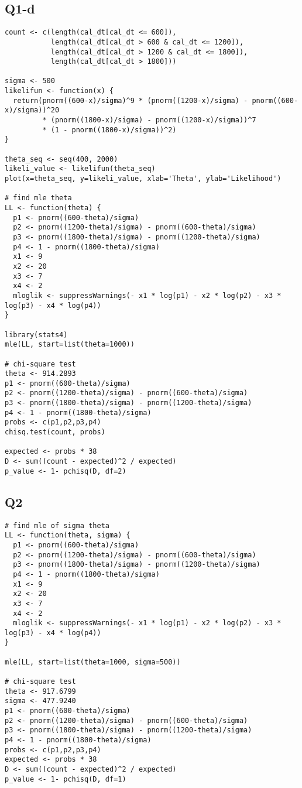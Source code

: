 \documentclass[11pt,letterpaper]{article}
\begin{document}
\subsection*{Q1-d}
\begin{verbatim}
count <- c(length(cal_dt[cal_dt <= 600]), 
           length(cal_dt[cal_dt > 600 & cal_dt <= 1200]), 
           length(cal_dt[cal_dt > 1200 & cal_dt <= 1800]),
           length(cal_dt[cal_dt > 1800]))

sigma <- 500
likelifun <- function(x) {
  return(pnorm((600-x)/sigma)^9 * (pnorm((1200-x)/sigma) - pnorm((600-x)/sigma))^20
         * (pnorm((1800-x)/sigma) - pnorm((1200-x)/sigma))^7 
         * (1 - pnorm((1800-x)/sigma))^2)
}

theta_seq <- seq(400, 2000)
likeli_value <- likelifun(theta_seq)
plot(x=theta_seq, y=likeli_value, xlab='Theta', ylab='Likelihood')

# find mle theta
LL <- function(theta) {
  p1 <- pnorm((600-theta)/sigma)
  p2 <- pnorm((1200-theta)/sigma) - pnorm((600-theta)/sigma)
  p3 <- pnorm((1800-theta)/sigma) - pnorm((1200-theta)/sigma)
  p4 <- 1 - pnorm((1800-theta)/sigma)
  x1 <- 9
  x2 <- 20
  x3 <- 7
  x4 <- 2
  mloglik <- suppressWarnings(- x1 * log(p1) - x2 * log(p2) - x3 * log(p3) - x4 * log(p4))
}

library(stats4)
mle(LL, start=list(theta=1000))

# chi-square test
theta <- 914.2893
p1 <- pnorm((600-theta)/sigma)
p2 <- pnorm((1200-theta)/sigma) - pnorm((600-theta)/sigma)
p3 <- pnorm((1800-theta)/sigma) - pnorm((1200-theta)/sigma)
p4 <- 1 - pnorm((1800-theta)/sigma)
probs <- c(p1,p2,p3,p4)
chisq.test(count, probs)

expected <- probs * 38
D <- sum((count - expected)^2 / expected)
p_value <- 1- pchisq(D, df=2)
\end{verbatim}

\subsection*{Q2}
\begin{verbatim}
# find mle of sigma theta
LL <- function(theta, sigma) {
  p1 <- pnorm((600-theta)/sigma)
  p2 <- pnorm((1200-theta)/sigma) - pnorm((600-theta)/sigma)
  p3 <- pnorm((1800-theta)/sigma) - pnorm((1200-theta)/sigma)
  p4 <- 1 - pnorm((1800-theta)/sigma)
  x1 <- 9
  x2 <- 20
  x3 <- 7
  x4 <- 2
  mloglik <- suppressWarnings(- x1 * log(p1) - x2 * log(p2) - x3 * log(p3) - x4 * log(p4))
}

mle(LL, start=list(theta=1000, sigma=500))

# chi-square test
theta <- 917.6799
sigma <- 477.9240 
p1 <- pnorm((600-theta)/sigma)
p2 <- pnorm((1200-theta)/sigma) - pnorm((600-theta)/sigma)
p3 <- pnorm((1800-theta)/sigma) - pnorm((1200-theta)/sigma)
p4 <- 1 - pnorm((1800-theta)/sigma)
probs <- c(p1,p2,p3,p4)
expected <- probs * 38
D <- sum((count - expected)^2 / expected)
p_value <- 1- pchisq(D, df=1)
\end{verbatim}
\end{document}
